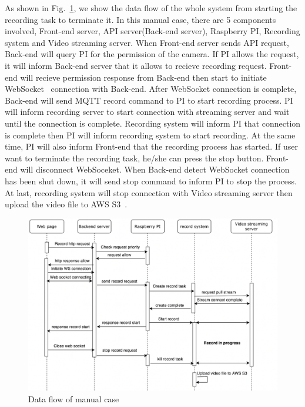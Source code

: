 As shown in Fig.~\ref{fig:manual-sequece-diagram}, we show the data flow of the whole system from starting the recording task to terminate it. In this manual case, there are 5 components involved, Front-end server, API server(Back-end server), Raspberry PI, Recording system and Video streaming server. When Front-end server sends API request, Back-end will query PI for the permission of the camera. If PI allows the request, it will inform Back-end server that it allows to recieve recording request. Front-end will recieve permission response from Back-end then start to initiate WebSocket~\cite{websocket} connection with Back-end. After WebSocket connection is complete, Back-end will send MQTT record command to PI to start recording process. PI will inform recording server to start connection with streaming server and wait until the connection is complete. Recording system will inform PI that connection is complete then PI will inform recording system to start recording. At the same time, PI will also inform Front-end that the recording process has started. If user want to terminate the recording task, he/she can press the stop button. Front-end will disconnect WebSoceket. When Back-end detect WebSocket connection has been shut down, it will send stop command to inform PI to stop the process. At last, recording system will stop connection with Video streaming server then upload the video file to AWS S3~\cite{aws-s3}.

\begin{figure}[H]
    \centering
    \includegraphics[width=\textwidth]{figsrc/manual-sequece-diagram.png}
    \caption{Data flow of manual case\label{fig:manual-sequece-diagram}}
\end{figure}

